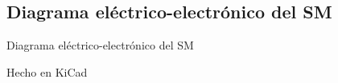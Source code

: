 \subsection{Diagrama el\'ectrico-electr\'onico del SM}
\label{Diagrama_electrico}

Diagrama el\'ectrico-electr\'onico del SM

Hecho en KiCad